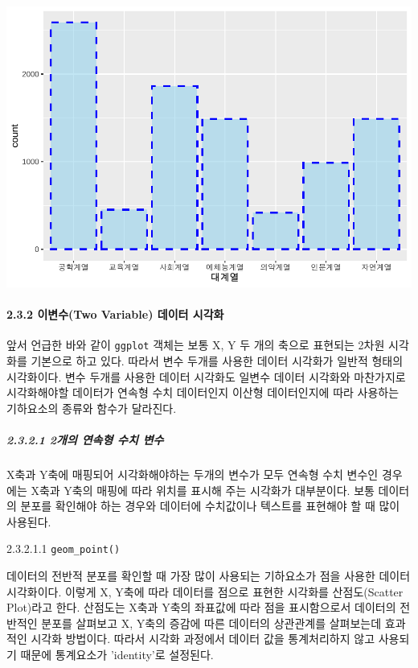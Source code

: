 \documentclass[
]{article}
\begin{document}
\includegraphics{chap3_files/figure-latex/unnamed-chunk-26-2.pdf}

\hypertarget{uxc774uxbcc0uxc218two-variable-uxb370uxc774uxd130-uxc2dcuxac01uxd654}{%
\paragraph{2.3.2 이변수(Two Variable) 데이터 시각화}\label{uxc774uxbcc0uxc218two-variable-uxb370uxc774uxd130-uxc2dcuxac01uxd654}}

앞서 언급한 바와 같이 \texttt{ggplot} 객체는 보통 X, Y 두 개의 축으로 표현되는 2차원 시각화를 기본으로 하고 있다. 따라서 변수 두개를 사용한 데이터 시각화가 일반적 형태의 시각화이다. 변수 두개를 사용한 데이터 시각화도 일변수 데이터 시각화와 마찬가지로 시각화해야할 데이터가 연속형 수치 데이터인지 이산형 데이터인지에 따라 사용하는 기하요소의 종류와 함수가 달라진다.

\hypertarget{uxac1cuxc758-uxc5f0uxc18duxd615-uxc218uxce58-uxbcc0uxc218}{%
\subparagraph{2.3.2.1 2개의 연속형 수치 변수}\label{uxac1cuxc758-uxc5f0uxc18duxd615-uxc218uxce58-uxbcc0uxc218}}

X축과 Y축에 매핑되어 시각화해야하는 두개의 변수가 모두 연속형 수치 변수인 경우에는 X축과 Y축의 매핑에 따라 위치를 표시해 주는 시각화가 대부분이다. 보통 데이터의 분포를 확인해야 하는 경우와 데이터에 수치값이나 텍스트를 표현해야 할 때 많이 사용된다.

2.3.2.1.1 \texttt{geom\_point()}

데이터의 전반적 분포를 확인할 때 가장 많이 사용되는 기하요소가 점을 사용한 데이터 시각화이다. 이렇게 X, Y축에 따라 데이터를 점으로 표현한 시각화를 산점도(Scatter Plot)라고 한다. 산점도는 X축과 Y축의 좌표값에 따라 점을 표시함으로서 데이터의 전반적인 분포를 살펴보고 X, Y축의 증감에 따른 데이터의 상관관계를 살펴보는데 효과적인 시각화 방법이다. 따라서 시각화 과정에서 데이터 값을 통계처리하지 않고 사용되기 때문에 통계요소가 'identity'로 설정된다.
\end{document}
